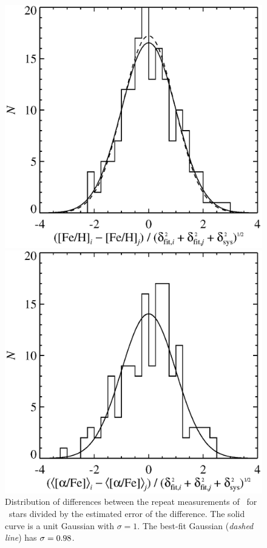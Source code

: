 \documentclass{emulateapj}
\begin{document}
\begin{figure}[t!]
\centering
\begin{minipage}[t]{0.4\textwidth}
\centering
\includegraphics[width=\textwidth]{fehdup_gauss.eps}
\caption{Distribution of differences between the repeat measurements
  of \feh\ for \ndup\ stars divided by the estimated error of the
  difference.  The solid curve is a unit Gaussian with $\sigma = 1$.
  The best-fit Gaussian ({\it dashed line}) has $\sigma =
  0.98$.\label{fig:fehdup}}
\end{minipage}
\hspace{0.1\textwidth}
\begin{minipage}[t]{0.4\textwidth}
\centering
\includegraphics[width=\textwidth]{alphadup_gauss.eps}

\end{minipage}
\end{figure}
\end{document}
